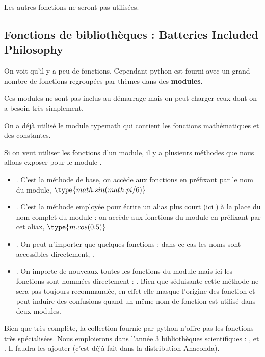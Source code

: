 Les autres fonctions ne seront pas utilisées.
\subsection{Fonctions de bibliothèques : Batteries Included Philosophy}
On voit qu'il y a peu de fonctions. 
 Cependant python est fourni avec un grand nombre de fonctions regroupées par thèmes dans des {\bf modules}.

Ces modules ne sont pas inclus au démarrage mais on peut charger ceux dont on a besoin très simplement.

On a déjà utilisé le module type{math} qui contient les fonctions mathématiques et des constantes.

Si on veut utiliser les fonctions d'un module, il y a plusieurs méthodes que nous allons exposer pour le module .
\begin{itemize}
\item {}. C'est la méthode de base, on accède aux fonctions en préfixant par le nom du module, $\type{math.sin(math.pi/6)}$
\item {}. C'est la méthode employée pour écrire un alias plus court (ici ) à la place du nom complet du module : on accède aux fonctions du module en préfixant par cet aliax, $\type{m.cos(0.5)}$
\item {}. On peut n'importer que quelques fonctions : dans ce cas les noms sont accessibles  directement, .
\item {}. On importe de nouveaux toutes les fonctions du module mais ici les fonctions sont nommées directement : . Bien que séduisante cette méthode ne sera pas toujours recommandée, en effet elle masque l'origine des fonction et peut induire des confusions quand un même nom de fonction est utilisé dans deux modules.
\end{itemize}

\medskip

Bien que très complète, la collection fournie par python n'offre pas les fonctions très spécialisées. Nous emploierons dans l'année 3 bibliothèques scientifiques : ,  et . Il faudra les ajouter (c'est déjà fait dans la distribution Anaconda).
